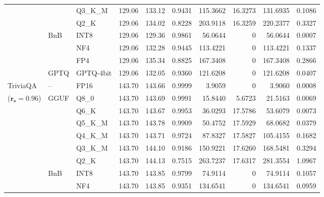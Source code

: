 \begin{longtable}{ll l rrrrrrr}
 &  & Q3\_K\_M & 129.06 & 133.12 & \cellcolor{red!18} 0.9431 & \cellcolor{red!18} 115.3662 & 16.3273 & \cellcolor{red!18} 131.6935 & \cellcolor{red!18} 0.1086 \\
 &  & Q2\_K & 129.06 & 134.02 & \cellcolor{red!18} 0.8228 & \cellcolor{red!18} 203.9118 & 16.3259 & \cellcolor{red!18} 220.2377 & \cellcolor{red!18} 0.3327 \\
 & BnB & INT8 & 129.06 & 129.36 & 0.9861 & 56.0644 & \cellcolor{cyan!12} $0$ & 56.0644 & 0.0007 \\
 &  & NF4 & 129.06 & 132.28 & \cellcolor{red!18} 0.9445 & \cellcolor{red!18} 113.4221 & \cellcolor{cyan!12} $0$ & \cellcolor{red!18} 113.4221 & \cellcolor{red!18} 0.1337 \\
 &  & FP4 & 129.06 & 135.34 & \cellcolor{red!18} 0.8825 & \cellcolor{red!18} 167.3408 & \cellcolor{cyan!12} $0$ & \cellcolor{red!18} 167.3408 & \cellcolor{red!18} 0.2866 \\
 & GPTQ & GPTQ-4bit & 129.06 & 132.05 & \cellcolor{red!18} 0.9360 & \cellcolor{red!18} 121.6208 & \cellcolor{cyan!12} $0$ & \cellcolor{red!18} 121.6208 & \cellcolor{red!18} 0.0407 \\
\midrule
TriviaQA & -- & FP16 & 143.70 & 143.66 & 0.9999 & 3.9059 & \cellcolor{cyan!12} $0$ & 3.9060 & 0.0008 \\
{\small ($\mathbf{r_s{=}0.96}$)} & GGUF & Q8\_0 & 143.70 & 143.69 & 0.9991 & 15.8440 & 5.6723 & 21.5163 & 0.0069 \\
 &  & Q6\_K & 143.70 & 143.67 & 0.9953 & 36.0293 & 17.5786 & 53.6079 & 0.0073 \\
 &  & Q5\_K\_M & 143.70 & 143.78 & 0.9909 & 50.4752 & 17.5929 & 68.0682 & 0.0379 \\
 &  & Q4\_K\_M & 143.70 & 143.71 & 0.9724 & 87.8327 & 17.5827 & 105.4155 & 0.1682 \\
 &  & Q3\_K\_M & 143.70 & 144.10 & \cellcolor{red!18} 0.9186 & \cellcolor{red!18} 150.9221 & 17.6260 & \cellcolor{red!18} 168.5481 & \cellcolor{red!18} 0.3294 \\
 &  & Q2\_K & 143.70 & 144.13 & \cellcolor{red!35} 0.7515 & \cellcolor{red!35} 263.7237 & 17.6317 & \cellcolor{red!35} 281.3554 & \cellcolor{red!35} 1.0967 \\
 & BnB & INT8 & 143.70 & 143.85 & 0.9799 & 74.9114 & \cellcolor{cyan!12} $0$ & 74.9114 & 0.1057 \\
 &  & NF4 & 143.70 & 143.85 & \cellcolor{red!18} 0.9351 & \cellcolor{red!18} 134.6541 & \cellcolor{cyan!12} $0$ & \cellcolor{red!18} 134.6541 & \cellcolor{red!18} 0.0959 \\

\end{longtable}
